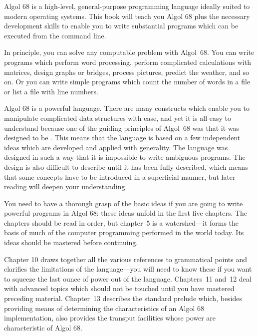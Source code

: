 %
%
%
%
Algol 68 is a high-level, general-purpose programming language ideally
suited to modern operating systems.  This book will teach you Algol 68
plus the necessary development skills to enable you to write
substantial programs which can be executed from the command line.

In principle, you can solve any computable problem with Algol~68.
You can write programs which perform word processing, perform
complicated calculations with matrices, design graphs or bridges,
process pictures, predict the weather, and so on.  Or you can write
simple programs which count the number of words in a file or list a
file with line numbers.

Algol 68 is a powerful language.  There are many constructs which
enable you to manipulate complicated data structures with ease, and
yet it is all easy to understand because one of the guiding
principles of Algol~68 was that it was designed to be
. This means that the
language is based on a few independent ideas which are developed and
applied with generality.  The language was designed in such a way
that it is impossible to write ambiguous programs.  The design is
also difficult to describe until it has been fully described, which
means that some concepts have to be introduced in a superficial
manner, but later reading will deepen your understanding.

You need to have a thorough grasp of the basic ideas if you are going
to write powerful programs in Algol 68: these ideas unfold in the
first five chapters.  The chapters should be read in order, but
chapter~5 is a watershed---it forms the basis of much of the computer
programming performed in the world today.  Its ideas should be
mastered before continuing.

Chapter 10 draws together all the various references to grammatical
points and clarifies the limitations of the language---you will need
to know these if you want to squeeze the last ounce of power out of
the language. Chapters~11 and~12 deal with advanced topics which
should not be touched until you have mastered preceding material.
Chapter~13 describes the standard prelude which, besides providing
means of determining the characteristics of an Algol 68
implementation, also provides the transput facilities whose power are
characteristic of Algol 68.

